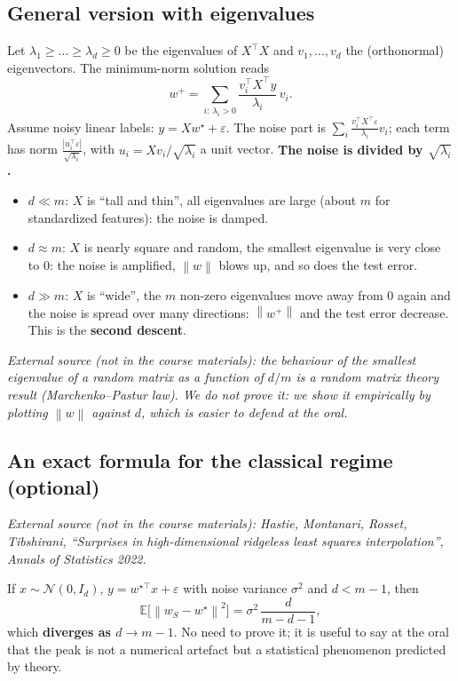 \documentclass[11pt,a4paper]{article}
\newcommand{\E}{\mathbb{E}}
\newcommand{\norm}[1]{\left\lVert #1 \right\rVert}
\newcommand{\esterna}[1]{\par\noindent\textit{External source (not in the course materials): #1}\par\smallskip}
\begin{document}
\subsection{General version with eigenvalues}
Let $\lambda_1 \ge \dots \ge \lambda_d \ge 0$ be the eigenvalues of $X^\top X$ and $v_1,\dots,v_d$ the (orthonormal)
eigenvectors. The minimum-norm solution reads
\[
  w^{+} = \sum_{i:\,\lambda_i > 0} \frac{v_i^\top X^\top y}{\lambda_i}\, v_i .
\]
Assume noisy linear labels: $y = Xw^\star + \varepsilon$. The noise part is
$\sum_i \frac{v_i^\top X^\top \varepsilon}{\lambda_i} v_i$; each term has norm
$\frac{|u_i^\top \varepsilon|}{\sqrt{\lambda_i}}$, with $u_i = Xv_i/\sqrt{\lambda_i}$ a unit vector.
\textbf{The noise is divided by $\sqrt{\lambda_i}$.}
\begin{itemize}
  \item $d \ll m$: $X$ is ``tall and thin'', all eigenvalues are large (about $m$ for standardized features):
        the noise is damped.
  \item $d \approx m$: $X$ is nearly square and random, the smallest eigenvalue is very close to $0$:
        the noise is amplified, $\norm{w}$ blows up, and so does the test error.
  \item $d \gg m$: $X$ is ``wide'', the $m$ non-zero eigenvalues move away from $0$ again and the noise is spread over
        many directions: $\norm{w^{+}}$ and the test error decrease. This is the \textbf{second descent}.
\end{itemize}
\esterna{the behaviour of the smallest eigenvalue of a random matrix as a function of $d/m$ is a random matrix theory
result (Marchenko--Pastur law). We do not prove it: we show it empirically by plotting $\norm{w}$ against $d$, which is
easier to defend at the oral.}

\subsection{An exact formula for the classical regime (optional)}
\esterna{Hastie, Montanari, Rosset, Tibshirani, ``Surprises in high-dimensional ridgeless least squares interpolation'',
Annals of Statistics 2022.}
If $x \sim \mathcal{N}(0, I_d)$, $y = w^{\star\top}x + \varepsilon$ with noise variance $\sigma^2$ and $d < m-1$, then
\[
  \E\bigl[\norm{w_S - w^\star}^2\bigr] = \sigma^2\,\frac{d}{m - d - 1},
\]
which \textbf{diverges as $d \to m-1$}. No need to prove it; it is useful to say at the oral that the peak is not a
numerical artefact but a statistical phenomenon predicted by theory.
\end{document}
